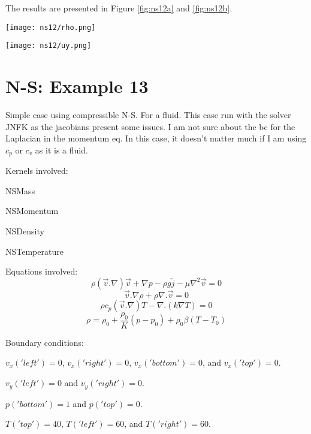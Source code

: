 \documentclass[11pt,letterpaper]{article}
\begin{document}
The results are presented in Figure \ref{fig:ns12a} and \ref{fig:ns12b}.
\begin{figure*}[!h]
	\centering
	\texttt{[image: ns12/rho.png]}
	\hfill
	\caption{Density.}
	\label{fig:ns12a}
\end{figure*}

\begin{figure*}[!h]
	\centering
	\texttt{[image: ns12/uy.png]}
	\hfill
	\caption{Velocity for changes in the density due to temperature gradient.}
	\label{fig:ns12b}
\end{figure*}

\section{N-S: Example 13}

Simple case using compressible N-S. For a fluid.
This case run with the solver JNFK as the jacobians present some issues.
I am not sure about the bc for the Laplacian in the momentum eq.
In this case, it doesn't matter much if I am using $c_{p}$ or $c_{v}$ as it is a fluid.

Kernels involved:
\begin{description}[font=$\bullet$\scshape\bfseries]
	\item[] NSMass
	\item[] NSMomentum
	\item[] NSDensity
	\item[] NSTemperature
\end{description}

Equations involved:
\begin{equation}
\rho (\vec{v}.\nabla)\vec{v} + \nabla p - \rho g \check{j} - \mu \nabla^{2}\vec{v} = 0
\end{equation}
\begin{equation}
\vec{v}.\nabla\rho+\rho\nabla.\vec{v}=0
\end{equation}
\begin{equation}
\rho c_{p} (\vec{v}.\nabla)T - \nabla .(k\nabla T) = 0
\end{equation}
\begin{equation}
\rho = \rho_{0} + \frac{\rho_{0}}{K}(p-p_{0}) + \rho_{0}\beta(T-T_{0})
\end{equation}

Boundary conditions:
\begin{description}[]
	\item[] $v_{x}('left')=0$, $v_{x}('right')=0$, $v_{x}('bottom')=0$, and $v_{x}('top')=0$.
	\item[] $v_{y}('left')=0$ and $v_{y}('right')=0$.
	\item[] $p('bottom')=1$ and $p('top')=0$.
	\item[] $T('top')=40$, $T('left')=60$, and $T('right')=60$.
\end{description}
\end{document}
